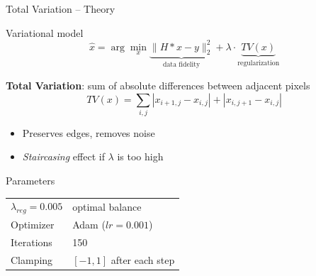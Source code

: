 \documentclass[english,10pt]{beamer}
\begin{document}
\begin{frame}{Total Variation -- Theory}
  \begin{block}{Variational model}
    \begin{equation*}
      \hat{x} = \arg\min_x \underbrace{\|H*x - y\|_2^2}_{\text{data fidelity}} + \lambda \cdot \underbrace{TV(x)}_{\text{regularization}}
    \end{equation*}
  \end{block}
  \vspace{0.2cm}
  \textbf{Total Variation}: sum of absolute differences between adjacent pixels
  \begin{equation*}
    TV(x) = \sum_{i,j} |x_{i+1,j} - x_{i,j}| + |x_{i,j+1} - x_{i,j}|
  \end{equation*}
  \vspace{0.2cm}
  \begin{itemize}
    \item Preserves edges, removes noise
    \item \textit{Staircasing} effect if $\lambda$ is too high
  \end{itemize}
  \vspace{0.2cm}
  \begin{block}{Parameters}
    \begin{tabular}{ll}
      $\lambda_{reg}=0.005$ & optimal balance \\
      Optimizer & Adam ($lr=0.001$) \\
      Iterations & 150 \\
      Clamping & $[-1,1]$ after each step \\
    \end{tabular}
  \end{block}
\end{frame}
\end{document}
